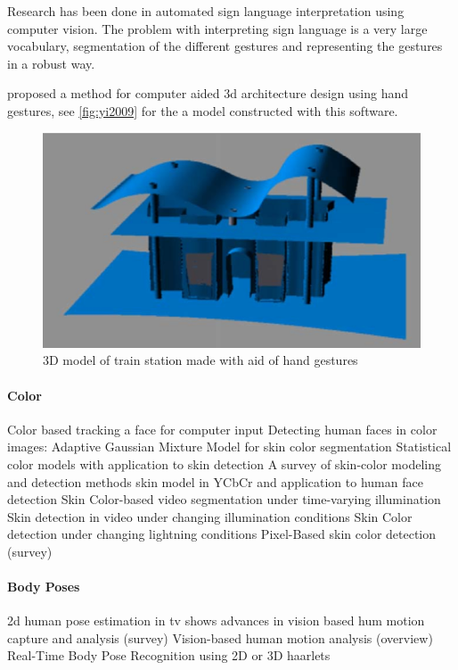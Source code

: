 Research has been done in automated sign language interpretation using computer vision\cite{Buehler2009}\cite{RichardBowden2004}. The problem with interpreting sign language is a very large vocabulary, segmentation of the different gestures and representing the gestures in a robust way.

\cite{Yi2009} proposed a method for computer aided 3d architecture design using hand gestures, see \autoref{fig:yi2009} for the a model constructed with this software.

\begin{figure}[htbp]
	\center{}
	\includegraphics[width=0.3\linewidth]{figures/yi2009.png}
	\caption{3D model of train station made with aid of hand gestures}
	\label{fig:yi2009}
\end{figure}


\paragraph{Color}
Color based tracking a face for computer input \cite{Bradski1998}
Detecting human faces in color images: \cite{Cai1999}
Adaptive Gaussian Mixture Model for skin color segmentation \cite{Hassanpour2008}
Statistical color models with application to skin detection \cite{Jones1999}
A survey of skin-color modeling and detection methods \cite{Kakumanu2007}
skin model in YCbCr and application to human face detection \cite{Phung2002}
Skin Color-based video segmentation under time-varying illumination \cite{Sigal2004}
Skin detection in video under changing illumination conditions \cite{Soriano2000}
Skin Color detection under changing lightning conditions \cite{Stoerring1999}
Pixel-Based skin color detection (survey) \cite{vsa03survey}

\paragraph{Body Poses}
2d human pose estimation in tv shows \cite{ferrari2008}
advances in vision based hum motion capture and analysis (survey) \cite{Moeslund2006}
Vision-based human motion analysis (overview) \cite{Poppe2007}
Real-Time Body Pose Recognition using 2D or 3D haarlets \cite{VandenBergh2009}

